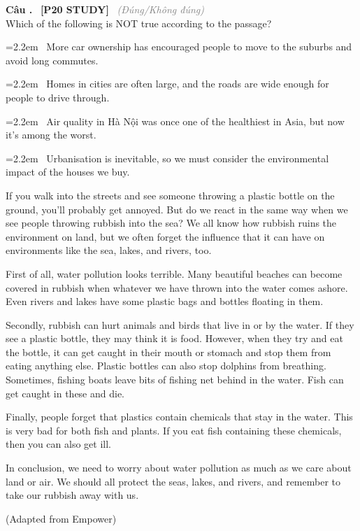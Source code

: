 \documentclass[12pt,a4paper,twoside]{article}
\newcounter{qcounter}
\newcommand{\question}[2][]{%
    \stepcounter{qcounter}%
    \par\vspace{6pt}%
    \noindent\textcolor{primaryBlue}{\textbf{Câu \theqcounter.}}~%
    \textcolor{secondaryBlue}{\small\textbf{[P20 STUDY]}}~%
    \if\relax\detokenize{#1}\relax\else\textcolor{gray}{\small\textit{(#1)}}~\fi\\[1pt]
    \noindent #2%
}
\newcommand{\choiceitem}[2]{%
    \tikz[baseline=-0.5ex]{%
        \node[draw=primaryBlue, circle, minimum size=1.5em, inner sep=0pt, thick] {\textbf{#1}};%
    }~#2%
}
\newenvironment{readingpassage}[1][]{%
    \begin{tcolorbox}[enhanced, colback=grayLight, colframe=secondaryBlue,
        coltitle=textDark, fonttitle=\bfseries, title={#1},
        rounded corners, arc=3mm, boxrule=1pt,
        left=15pt, right=15pt, top=10pt, bottom=10pt,
        breakable, before skip=10pt, after skip=10pt, drop fuzzy shadow]
    \setstretch{1.3}
}{\end{tcolorbox}}
\begin{document}
\question[Đúng/Không đúng]{Which of the following is NOT true according to the passage?}

\par\vspace{4pt}
\noindent\hangindent=2.2em\choiceitem{A}{More car ownership has encouraged people to move to the suburbs and avoid long commutes.}\par\vspace{4pt}
\noindent\hangindent=2.2em\choiceitem{B}{Homes in cities are often large, and the roads are wide enough for people to drive through.}\par\vspace{4pt}
\noindent\hangindent=2.2em\choiceitem{C}{Air quality in Hà Nội was once one of the healthiest in Asia, but now it's among the worst.}\par\vspace{4pt}
\noindent\hangindent=2.2em\choiceitem{D}{Urbanisation is inevitable, so we must consider the environmental impact of the houses we buy.}\par\vspace{4pt}

\begin{readingpassage}[]
If you walk into the streets and see someone throwing a plastic bottle on the ground, you'll probably get annoyed. But do we react in the same way when we see people throwing rubbish into the sea? We all know how rubbish ruins the environment on land, but we often forget the influence that it can have on environments like the sea, lakes, and rivers, too.

First of all, water pollution looks terrible. Many beautiful beaches can become covered in rubbish when whatever we have thrown into the water comes ashore. Even rivers and lakes have some plastic bags and bottles floating in them.

Secondly, rubbish can hurt animals and birds that live in or by the water. If they see a plastic bottle, they may think it is food. However, when they try and eat the bottle, it can get caught in their mouth or stomach and stop them from eating anything else. Plastic bottles can also stop dolphins from breathing. Sometimes, fishing boats leave bits of fishing net behind in the water. Fish can get caught in these and die.

Finally, people forget that plastics contain chemicals that stay in the water. This is very bad for both fish and plants. If you eat fish containing these chemicals, then you can also get ill.

In conclusion, we need to worry about water pollution as much as we care about land or air. We should all protect the seas, lakes, and rivers, and remember to take our rubbish away with us.

(Adapted from Empower)
\end{readingpassage}
\end{document}
